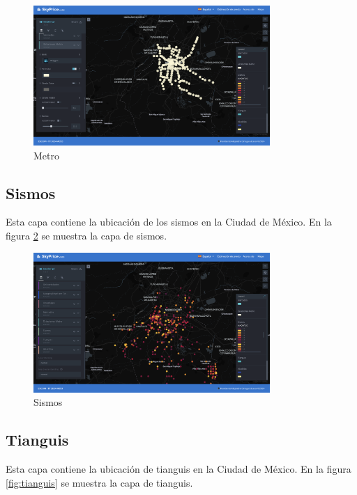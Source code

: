 \begin{figure}[H]
    \centering
    \includegraphics[width=0.8\textwidth]{imagenes/05-mapa-interactivo/metro.png}
    \caption{Metro}
    \label{fig:metro}
\end{figure}

\subsection{Sismos}
Esta capa contiene la ubicación de los sismos en la Ciudad de México. En la figura
\ref{fig:sismos} se muestra la capa de sismos.

\begin{figure}[H]
    \centering
    \includegraphics[width=0.8\textwidth]{imagenes/05-mapa-interactivo/sismos.png}
    \caption{Sismos}
    \label{fig:sismos}
\end{figure}

\subsection{Tianguis}
Esta capa contiene la ubicación de tianguis en la Ciudad de México. En la figura
\ref{fig:tianguis} se muestra la capa de tianguis.

